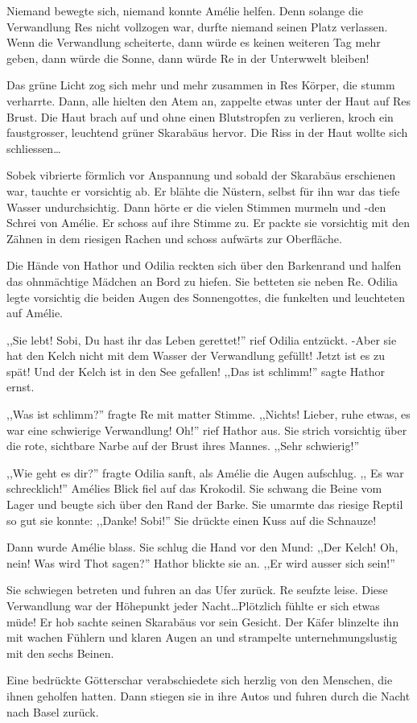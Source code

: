 Niemand bewegte sich, niemand konnte Amélie helfen. Denn solange die Verwandlung Res nicht vollzogen war, durfte niemand seinen Platz verlassen. Wenn die Verwandlung scheiterte, dann würde es keinen weiteren Tag mehr geben, dann würde die Sonne, dann würde Re in der Unterwwelt bleiben!

Das grüne Licht zog sich mehr und mehr zusammen in Res Körper, die stumm verharrte. Dann, alle hielten den Atem an, zappelte etwas unter der Haut auf Res Brust. Die Haut brach auf und ohne einen Blutstropfen zu verlieren, kroch ein faustgrosser, leuchtend grüner Skarabäus hervor. Die Riss in der Haut wollte sich schliessen\dots

Sobek vibrierte förmlich vor Anspannung und sobald der Skarabäus erschienen war, tauchte er vorsichtig ab. Er blähte die Nüstern, selbst für ihn war das tiefe Wasser undurchsichtig. Dann hörte er die vielen Stimmen murmeln und -den Schrei von Amélie. Er schoss auf ihre Stimme zu. Er packte sie vorsichtig mit den Zähnen in dem riesigen Rachen und schoss aufwärts zur Oberfläche.

Die Hände von Hathor und Odilia reckten sich über den Barkenrand und halfen das ohnmächtige Mädchen an Bord zu hiefen. Sie betteten sie neben Re. Odilia legte vorsichtig die beiden Augen des Sonnengottes, die funkelten und leuchteten auf Amélie. 

,,Sie lebt! Sobi, Du hast ihr das Leben gerettet!'' rief Odilia entzückt. -Aber sie hat den Kelch nicht mit dem Wasser der Verwandlung gefüllt! Jetzt ist es zu spät! Und der Kelch ist in den See gefallen! ,,Das ist schlimm!'' sagte Hathor ernst.

,,Was ist schlimm?'' fragte Re mit matter Stimme. ,,Nichts! Lieber, ruhe etwas, es war eine schwierige Verwandlung! Oh!'' rief Hathor aus. Sie strich vorsichtig über die rote, sichtbare Narbe auf der Brust ihres Mannes. ,,Sehr schwierig!''

,,Wie geht es dir?'' fragte Odilia sanft, als Amélie die Augen aufschlug. ,, Es war schrecklich!'' Amélies Blick fiel auf das Krokodil. Sie schwang die Beine vom Lager und beugte sich über den Rand der Barke. Sie umarmte das riesige Reptil so gut sie konnte: ,,Danke! Sobi!'' Sie drückte einen Kuss auf die Schnauze!

Dann wurde Amélie blass. Sie schlug die Hand vor den Mund: ,,Der Kelch! Oh, nein! Was wird Thot sagen?'' Hathor blickte sie an. ,,Er wird ausser sich sein!''

Sie schwiegen betreten und fuhren an das Ufer zurück. Re seufzte leise. Diese Verwandlung war der Höhepunkt jeder Nacht\dots Plötzlich fühlte er sich etwas müde! Er hob sachte seinen Skarabäus vor sein Gesicht. Der Käfer blinzelte ihn mit wachen Fühlern und klaren Augen an und strampelte unternehmungslustig mit den sechs Beinen.

\sterne

Eine bedrückte Götterschar verabschiedete sich herzlig von den Menschen, die ihnen geholfen hatten. Dann stiegen sie in ihre Autos und fuhren durch die Nacht nach Basel zurück.
